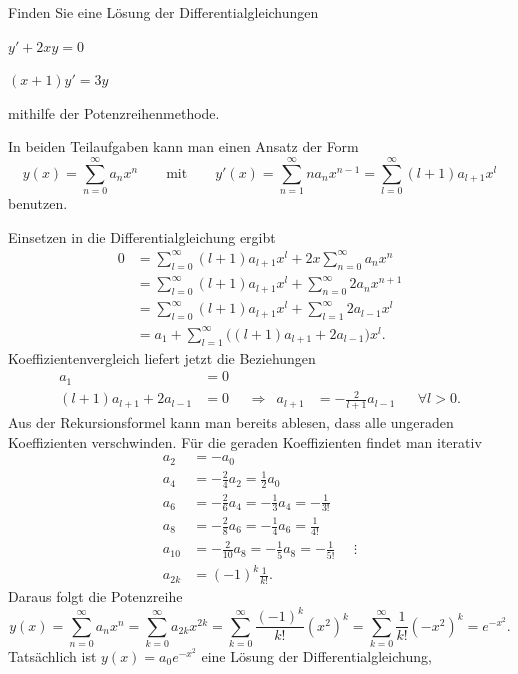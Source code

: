Finden Sie eine Lösung der Differentialgleichungen
\begin{teilaufgaben}
\item $y'+2xy=0$
\item $(x+1)y'=3y$
\end{teilaufgaben}
mithilfe der Potenzreihenmethode.

\begin{loesung}
In beiden Teilaufgaben kann man einen Ansatz der Form
\[
y(x)
=
\sum_{n=0}^\infty a_n x^n
\qquad\text{mit}\qquad
y'(x)
=
\sum_{n=1}^\infty na_n x^{n-1}
=
\sum_{l=0}^\infty (l+1)a_{l+1} x^l
\]
benutzen.
\begin{teilaufgaben}
\item
Einsetzen in die Differentialgleichung ergibt
\begin{align*}
0
&=
\sum_{l=0}^\infty (l+1)a_{l+1} x^l
+2x
\sum_{n=0}^\infty a_n x^n
\\
&=
\sum_{l=0}^\infty (l+1)a_{l+1} x^l
+
\sum_{n=0}^\infty 2a_n x^{n+1}
\\
&=
\sum_{l=0}^\infty (l+1)a_{l+1} x^l
+
\sum_{l=1}^\infty 2a_{l-1} x^l
\\
&=
a_1
+
\sum_{l=1}^\infty \bigl((l+1)a_{l+1} + 2a_{l-1}\bigr)x^l.
\end{align*}
Koeffizientenvergleich liefert jetzt 
die Beziehungen
\begin{align*}
a_1
&=
0
\\
(l+1)a_{l+1} + 2a_{l-1}
&=
0
&&\Rightarrow&
a_{l+1} &= -\frac{2}{l+1} a_{l-1}
&&\forall l > 0.
\end{align*}
Aus der Rekursionsformel kann man bereits ablesen, dass alle
ungeraden Koeffizienten verschwinden.
Für die geraden Koeffizienten findet man iterativ
\begin{align*}
a_2 &= -a_0 \\
a_4 &= -\frac{2}{4} a_2 = \frac12 a_0 \\
a_6 &= -\frac{2}{6} a_4 = -\frac{1}{3} a_4 = -\frac{1}{3!} \\
a_8 &= -\frac{2}{8} a_6 = -\frac{1}{4} a_6 = \frac{1}{4!} \\
a_{10} &= -\frac{2}{10} a_8 = -\frac{1}{5} a_8 = -\frac{1}{5!}
 &\phantom{a}\vdots \\
a_{2k} &= (-1)^k\frac{1}{k!}.
\end{align*}
Daraus folgt die Potenzreihe
\[
y(x)
=
\sum_{n=0}^\infty
a_n x^n
=
\sum_{k=0}^\infty
a_{2k} x^{2k}
=
\sum_{k=0}^\infty
\frac{(-1)^k}{k!} (x^2)^k
=
\sum_{k=0}^\infty
\frac{1}{k!} (-x^2)^k
=
e^{-x^2}.
\]
Tatsächlich ist $y(x)=a_0e^{-x^2}$ eine Lösung der Differentialgleichung,

\end{teilaufgaben}
\end{loesung}
